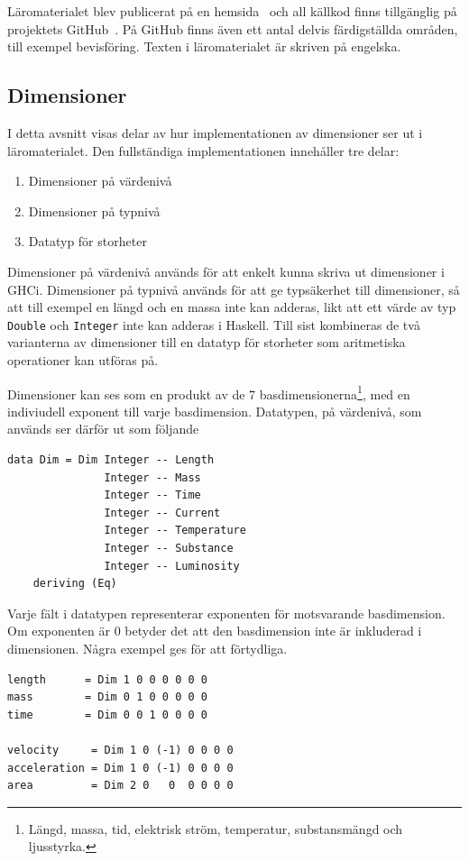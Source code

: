 Läromaterialet blev publicerat på en hemsida~\cite{LYAP} och all källkod finns
tillgänglig på projektets GitHub~\cite{LYAP_repo}. På GitHub finns även ett
antal delvis färdigställda områden, till exempel bevisföring. Texten i
läromaterialet är skriven på engelska.

\subsection{Dimensioner}
\label{sec:grund_impl}

I detta avsnitt visas delar av hur implementationen av dimensioner ser ut i läromaterialet. Den fullständiga implementationen innehåller tre delar:

\begin{enumerate}
  \item Dimensioner på värdenivå
  \item Dimensioner på typnivå
  \item Datatyp för storheter
\end{enumerate}

Dimensioner på värdenivå används för att enkelt kunna skriva ut dimensioner i GHCi. Dimensioner på typnivå används för att ge typsäkerhet till dimensioner, så att till exempel en längd och en massa inte kan adderas, likt att ett värde av typ \texttt{Double} och \texttt{Integer} inte kan adderas i Haskell. Till sist kombineras de två varianterna av dimensioner till en datatyp för storheter som aritmetiska operationer kan utföras på.

Dimensioner kan ses som en produkt av de 7 basdimensionerna\footnote{Längd, massa, tid, elektrisk ström, temperatur, substansmängd och ljusstyrka.}, med en indiviudell exponent till varje basdimension. Datatypen, på värdenivå, som används ser därför ut som följande

\begin{lstlisting}[frame=none,belowskip=-0.5\baselineskip]
data Dim = Dim Integer -- Length
               Integer -- Mass
               Integer -- Time
               Integer -- Current
               Integer -- Temperature
               Integer -- Substance
               Integer -- Luminosity
    deriving (Eq)
\end{lstlisting}

Varje fält i datatypen representerar exponenten för motsvarande basdimension. Om exponenten är $0$ betyder det att den basdimension inte är inkluderad i dimensionen. Några exempel ges för att förtydliga.

\begin{lstlisting}[frame=none,belowskip=-0.5\baselineskip]
length      = Dim 1 0 0 0 0 0 0
mass        = Dim 0 1 0 0 0 0 0
time        = Dim 0 0 1 0 0 0 0

velocity     = Dim 1 0 (-1) 0 0 0 0
acceleration = Dim 1 0 (-1) 0 0 0 0
area         = Dim 2 0   0  0 0 0 0
\end{lstlisting}

